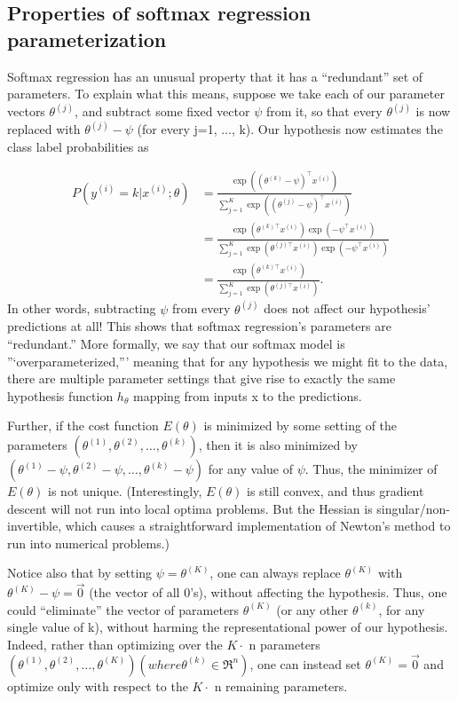 \subsection{Properties of softmax regression parameterization}

Softmax regression has an unusual property that it has a “redundant” set of parameters. To explain what this means, suppose we take each of our parameter vectors $\theta^{(j)}$, and subtract some fixed vector $\psi$ from it, so that every $\theta^{(j)}$ is now replaced with $\theta^{(j)} - \psi$ (for every j=1, $\ldots$, k). Our hypothesis now estimates the class label probabilities as

\begin{align} 
P(y^{(i)} = k | x^{(i)} ; \theta) &= \frac{\exp((\theta^{(k)}-\psi)^\top x^{(i)})}{\sum_{j=1}^K \exp( (\theta^{(j)}-\psi)^\top x^{(i)})} \\ &= \frac{\exp(\theta^{(k)\top} x^{(i)}) \exp(-\psi^\top x^{(i)})}{\sum_{j=1}^K \exp(\theta^{(j)\top} x^{(i)}) \exp(-\psi^\top x^{(i)})} \\ &= \frac{\exp(\theta^{(k)\top} x^{(i)})}{\sum_{j=1}^K \exp(\theta^{(j)\top} x^{(i)})}. 
\end{align}
In other words, subtracting $\psi$ from every $\theta^{(j)}$ does not affect our hypothesis’ predictions at all! This shows that softmax regression’s parameters are “redundant.” More formally, we say that our softmax model is ”‘overparameterized,”’ meaning that for any hypothesis we might fit to the data, there are multiple parameter settings that give rise to exactly the same hypothesis function $h_\theta$ mapping from inputs x to the predictions.

Further, if the cost function $E(\theta)$ is minimized by some setting of the parameters $(\theta^{(1)}, \theta^{(2)},\ldots, \theta^{(k)})$, then it is also minimized by $(\theta^{(1)} - \psi, \theta^{(2)} - \psi,\ldots, \theta^{(k)} - \psi)$ for any value of $\psi$. Thus, the minimizer of $E(\theta)$ is not unique. (Interestingly, $E(\theta)$ is still convex, and thus gradient descent will not run into local optima problems. But the Hessian is singular/non-invertible, which causes a straightforward implementation of Newton’s method to run into numerical problems.)

Notice also that by setting $\psi = \theta^{(K)}$, one can always replace $\theta^{(K)}$ with $\theta^{(K)} - \psi = \vec{0}$ (the vector of all 0’s), without affecting the hypothesis. Thus, one could “eliminate” the vector of parameters $\theta^{(K)}$ (or any other $\theta^{(k)}$, for any single value of k), without harming the representational power of our hypothesis. Indeed, rather than optimizing over the $K\cdot$ n parameters $(\theta^{(1)}, \theta^{(2)},\ldots, \theta^{(K)}) (where \theta^{(k)} \in \Re^{n})$, one can instead set $\theta^{(K)} = \vec{0}$ and optimize only with respect to the $K \cdot$ n remaining parameters.

